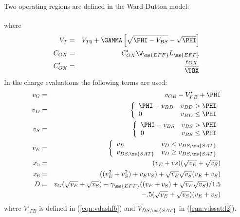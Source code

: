 {Two operating regions are defined in the Ward-Dutton model:\\[0.1in]
\hspace*{\fill}\\[0.1in]
\noindent where
\begin{eqnarray}
V_{T} & = & V_{T0} + \GAMMA
        \left[\sqrt{\PHI - V_{BS}}-\sqrt{\PHI} \right]\\
C_{OX}&=& C'_{OX}\W_{\ms{EFF}} L_{\ms{EFF}}\\
C'_{OX}&=&{{\epsilon_{OX}} \over { \TOX}}\\
\end{eqnarray}
\noindent In the charge evaluations the following terms are used:
\begin{eqnarray}
  v_{G}  &=& v_{GB} - V'_{FB} + \PHI\\
    v_D  &=& \left\{ \begin{array}{ll}
             \PHI - v_{BD} & v_{BD} > \PHI \\
             0 &v_{BD} \le \PHI
             \end{array} \right. %
             \\
    v_S  &=& \left\{ \begin{array}{ll}
             \PHI - v_{BS} & v_{BS} > \PHI \\
             0 &v_{BS} \le \PHI
             \end{array} \right. %
             \\
    v_E  &=& \left\{ \begin{array}{ll}
              v_D     & v_D < v_{DS,\ms{SAT}}\\
              v_{DS,\ms{SAT}} & v_D \ge v_{DS,\ms{SAT}}
              \end{array}
              \right. %
              \\
    x_5  &=& (v_E + vs)( \sqrt{v_E} + \sqrt{v_S})\\
    x_6  &=& ((v_E^2+v_S^2) + v_Ev_S) + \sqrt{v_E}\sqrt{v_S} (v_E+v_S)\\
    D   &=& v_G (\sqrt{v_E}+\sqrt{v_S})
          - \gamma_{\ms{EFF}} ( (v_E+v_S) + \sqrt{v_E}\sqrt{v_S} )/1.5
          \nonumber \\
          && - .5 (\sqrt{v_E}+\sqrt{v_S}) (v_E+v_S)
\end{eqnarray}
where $V'_{FB}$ is defined in (\ref{eqn:vdashfb}) and
$V_{DS,\ms{SAT}}$ in (\ref{eqn:vdssat:l2}).

}
